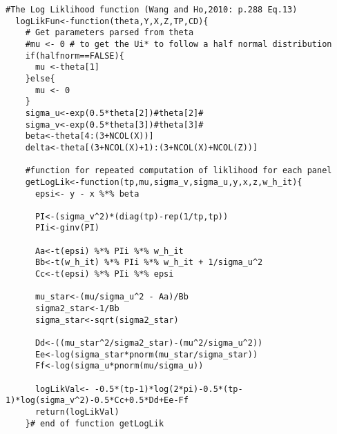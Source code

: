 \begin{lstlisting}[label=Rcode1, caption=R-Code for Maximum Likelihood Function]
  #The Log Liklihood function (Wang and Ho,2010: p.288 Eq.13)
  logLikFun<-function(theta,Y,X,Z,TP,CD){    
    # Get parameters parsed from theta
    #mu <- 0 # to get the Ui* to follow a half normal distribution
    if(halfnorm==FALSE){
      mu <-theta[1]  
    }else{
      mu <- 0
    }    
    sigma_u<-exp(0.5*theta[2])#theta[2]#
    sigma_v<-exp(0.5*theta[3])#theta[3]#
    beta<-theta[4:(3+NCOL(X))]
    delta<-theta[(3+NCOL(X)+1):(3+NCOL(X)+NCOL(Z))]
    
    #function for repeated computation of liklihood for each panel
    getLogLik<-function(tp,mu,sigma_v,sigma_u,y,x,z,w_h_it){      
      epsi<- y - x %*% beta    
      
      PI<-(sigma_v^2)*(diag(tp)-rep(1/tp,tp))
      PIi<-ginv(PI)      
      
      Aa<-t(epsi) %*% PIi %*% w_h_it
      Bb<-t(w_h_it) %*% PIi %*% w_h_it + 1/sigma_u^2
      Cc<-t(epsi) %*% PIi %*% epsi
      
      mu_star<-(mu/sigma_u^2 - Aa)/Bb
      sigma2_star<-1/Bb
      sigma_star<-sqrt(sigma2_star)      
      
      Dd<-((mu_star^2/sigma2_star)-(mu^2/sigma_u^2))
      Ee<-log(sigma_star*pnorm(mu_star/sigma_star))
      Ff<-log(sigma_u*pnorm(mu/sigma_u))
      
      logLikVal<- -0.5*(tp-1)*log(2*pi)-0.5*(tp-1)*log(sigma_v^2)-0.5*Cc+0.5*Dd+Ee-Ff        
      return(logLikVal)       
    }# end of function getLogLik
       

\end{lstlisting}
